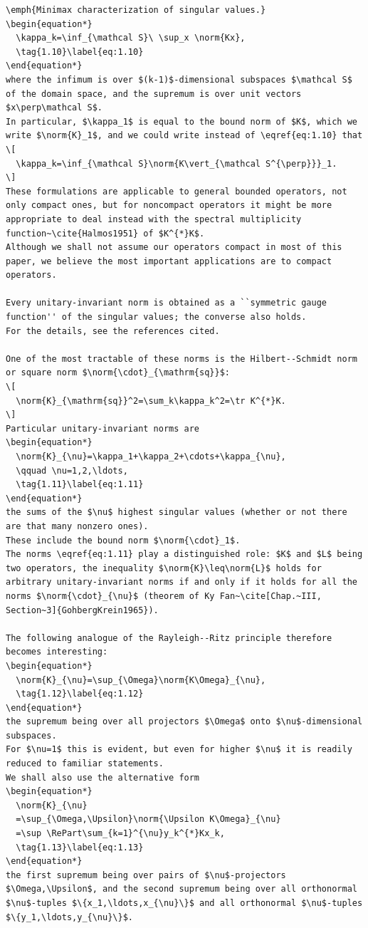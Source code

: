 \begin{verbatim}
\emph{Minimax characterization of singular values.}
\begin{equation*}
  \kappa_k=\inf_{\mathcal S}\ \sup_x \norm{Kx},
  \tag{1.10}\label{eq:1.10}
\end{equation*}
where the infimum is over $(k-1)$-dimensional subspaces $\mathcal S$ of the domain space, and the supremum is over unit vectors $x\perp\mathcal S$.
In particular, $\kappa_1$ is equal to the bound norm of $K$, which we write $\norm{K}_1$, and we could write instead of \eqref{eq:1.10} that
\[
  \kappa_k=\inf_{\mathcal S}\norm{K\vert_{\mathcal S^{\perp}}}_1.
\]
These formulations are applicable to general bounded operators, not only compact ones, but for noncompact operators it might be more appropriate to deal instead with the spectral multiplicity function~\cite{Halmos1951} of $K^{*}K$.
Although we shall not assume our operators compact in most of this paper, we believe the most important applications are to compact operators.

Every unitary-invariant norm is obtained as a ``symmetric gauge function'' of the singular values; the converse also holds.
For the details, see the references cited.

One of the most tractable of these norms is the Hilbert--Schmidt norm or square norm $\norm{\cdot}_{\mathrm{sq}}$:
\[
  \norm{K}_{\mathrm{sq}}^2=\sum_k\kappa_k^2=\tr K^{*}K.
\]
Particular unitary-invariant norms are
\begin{equation*}
  \norm{K}_{\nu}=\kappa_1+\kappa_2+\cdots+\kappa_{\nu},
  \qquad \nu=1,2,\ldots,
  \tag{1.11}\label{eq:1.11}
\end{equation*}
the sums of the $\nu$ highest singular values (whether or not there are that many nonzero ones).
These include the bound norm $\norm{\cdot}_1$.
The norms \eqref{eq:1.11} play a distinguished role: $K$ and $L$ being two operators, the inequality $\norm{K}\leq\norm{L}$ holds for arbitrary unitary-invariant norms if and only if it holds for all the norms $\norm{\cdot}_{\nu}$ (theorem of Ky Fan~\cite[Chap.~III, Section~3]{GohbergKrein1965}).

The following analogue of the Rayleigh--Ritz principle therefore becomes interesting:
\begin{equation*}
  \norm{K}_{\nu}=\sup_{\Omega}\norm{K\Omega}_{\nu},
  \tag{1.12}\label{eq:1.12}
\end{equation*}
the supremum being over all projectors $\Omega$ onto $\nu$-dimensional subspaces.
For $\nu=1$ this is evident, but even for higher $\nu$ it is readily reduced to familiar statements.
We shall also use the alternative form
\begin{equation*}
  \norm{K}_{\nu}
  =\sup_{\Omega,\Upsilon}\norm{\Upsilon K\Omega}_{\nu}
  =\sup \RePart\sum_{k=1}^{\nu}y_k^{*}Kx_k,
  \tag{1.13}\label{eq:1.13}
\end{equation*}
the first supremum being over pairs of $\nu$-projectors $\Omega,\Upsilon$, and the second supremum being over all orthonormal $\nu$-tuples $\{x_1,\ldots,x_{\nu}\}$ and all orthonormal $\nu$-tuples $\{y_1,\ldots,y_{\nu}\}$.
\end{verbatim}

